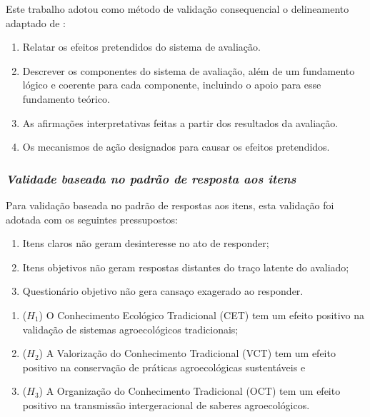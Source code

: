 Este trabalho adotou como método de validação consequencial o delineamento adaptado de :

\begin{enumerate}[label=\roman*]

\item Relatar os efeitos pretendidos do sistema de avaliação.
\item Descrever os componentes do sistema de avaliação, além de um fundamento lógico e coerente para cada componente, incluindo o apoio para esse fundamento teórico.
\item As afirmações interpretativas feitas a partir dos resultados da avaliação.
\item Os mecanismos de ação designados para causar os efeitos pretendidos.
\end{enumerate}

\subsubsection*{\textit{Validade baseada no padrão de resposta aos itens}}

Para validação baseada no padrão de respostas aos itens, esta validação foi adotada com os seguintes pressupostos:

\begin{enumerate}[label=\roman*.]
\item Itens claros não geram desinteresse no ato de responder;
\item Itens objetivos não geram respostas distantes do traço latente do avaliado;
\item Questionário objetivo não gera cansaço exagerado ao responder.
\end{enumerate}


\begin{enumerate}
\item ($H_1$) O Conhecimento Ecológico Tradicional (CET) tem um efeito positivo na validação de sistemas agroecológicos tradicionais;
\item ($H_2$) A Valorização do Conhecimento Tradicional (VCT) tem um efeito positivo na conservação de práticas agroecológicas sustentáveis e
\item ($H_3$) A Organização do Conhecimento Tradicional (OCT) tem um efeito positivo na transmissão intergeracional de saberes agroecológicos.
\end{enumerate}








